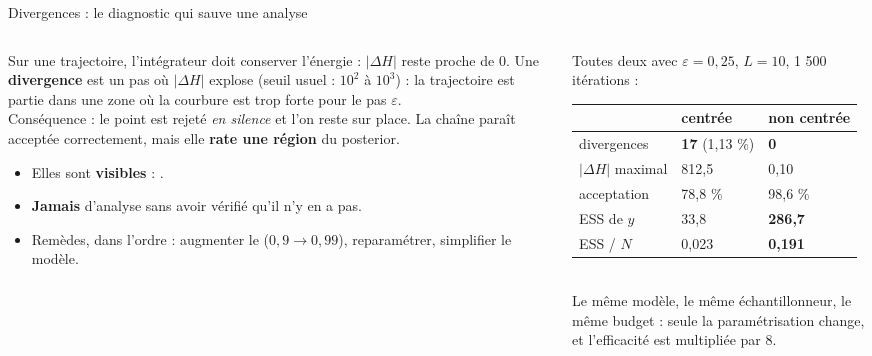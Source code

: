 \begin{frame}{Divergences : le diagnostic qui sauve une analyse}
\footnotesize
\begin{columns}[t]
\begin{column}{0.5\textwidth}
\begin{wbox}
Sur une trajectoire, l'intégrateur doit conserver l'énergie : $|\Delta H|$
reste proche de 0. Une \textbf{divergence} est un pas où
$|\Delta H|$ explose (seuil usuel : $10^2$ à $10^3$) : la trajectoire est partie
dans une zone où la courbure est trop forte pour le pas $\varepsilon$.
\\[1mm]
Conséquence : le point est rejeté \emph{en silence} et l'on reste sur place.
La chaîne paraît acceptée correctement, mais elle \textbf{rate une région} du
posterior.
\end{wbox}
\begin{kbox}
\begin{itemize}
  \item Elles sont \textbf{visibles} : .
  \item \textbf{Jamais} d'analyse sans avoir vérifié qu'il n'y en a pas.
  \item Remèdes, dans l'ordre : augmenter le 
        ($0{,}9 \to 0{,}99$), reparamétrer, simplifier le modèle.
\end{itemize}
\end{kbox}
\end{column}
\begin{column}{0.48\textwidth}
\begin{solbox}
Toutes deux avec $\varepsilon = 0{,}25$, $L = 10$, 1 500 itérations :
\begin{tabular}{@{}lll@{}}
\toprule
& \textbf{centrée} & \textbf{non centrée} \\
\midrule
divergences & \textbf{17} (1,13 \%) & \textbf{0} \\
$|\Delta H|$ maximal & 812,5 & 0,10 \\
acceptation & 78,8 \% & 98,6 \% \\
ESS de $y$ & 33,8 & \textbf{286,7} \\
ESS / $N$ & 0,023 & \textbf{0,191} \\
\bottomrule
\end{tabular}
\vspace{1mm}
\\ Le même modèle, le même échantillonneur, le même budget : seule la
paramétrisation change, et l'efficacité est multipliée par 8.
\end{solbox}
\end{column}
\end{columns}
\end{frame}

